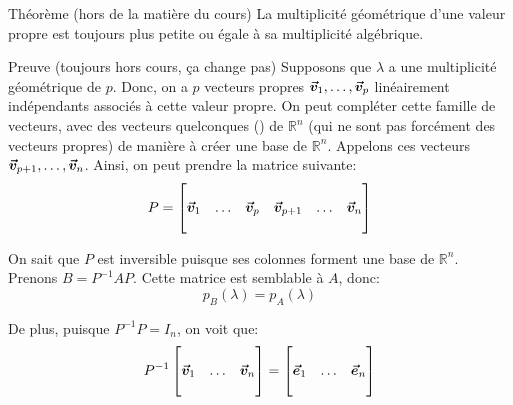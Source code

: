 \documentclass[a4paper]{article}
\begin{document}
\begin{parag}{Théorème (hors de la matière du cours)}
    La multiplicité géométrique d'une valeur propre est toujours plus petite ou égale à sa multiplicité algébrique.

    \begin{subparag}{Preuve (toujours hors cours, ça change pas)}
        Supposons que $\lambda$ a une multiplicité géométrique de $p$. Donc, on a $p$ vecteurs propres $\bm{\protect\vec{v}}_1, \ldots, \bm{\protect\vec{v}}_p$ linéairement indépendants associés à cette valeur propre. On peut compléter cette famille de vecteurs, avec des vecteurs quelconques () de $\mathbb{R}^n$ (qui ne sont pas forcément des vecteurs propres) de manière à créer une base de $\mathbb{R}^n$. Appelons ces vecteurs $\bm{\protect\vec{v}}_{p+1}, \ldots, \bm{\protect\vec{v}}_{n}$. Ainsi, on peut prendre la matrice suivante: 
        \[P = \begin{bmatrix}  &  &  &  & & \\ \bm{\protect\vec{v}}_1 & \ldots & \bm{\protect\vec{v}}_p & \bm{\protect\vec{v}}_{p+1} & \ldots & \bm{\protect\vec{v}}_{n} \\  &  &  &  & & \end{bmatrix} \]

        On sait que $P$ est inversible puisque ses colonnes forment une base de $\mathbb{R}^n$. Prenons $B = P^{-1} A P$. Cette matrice est semblable à $A$, donc: 
        \[p_B\left(\lambda\right) = p_A\left(\lambda\right)\]
        
        De plus, puisque $P^{-1} P = I_n$, on voit que: 
        \[P^{-1} \begin{bmatrix}  &  &  \\ \bm{\protect\vec{v}}_1 & \ldots & \bm{\protect\vec{v}}_n \\  &  &  \end{bmatrix} = \begin{bmatrix}  &  &  \\ \bm{\protect\vec{e}}_1 & \ldots & \bm{\protect\vec{e}}_n \\  &  &  \end{bmatrix} \]
        

\end{subparag}
\end{parag}
\end{document}
